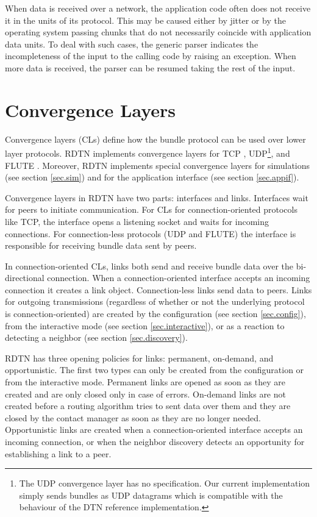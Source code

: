\documentclass[a4paper]{article}
\begin{document}
When data is received over a network, the application code often does not
receive it in the units of its protocol. This may be caused either by jitter or
by the operating system passing chunks that do not necessarily coincide with
application data units. To deal with such cases, the generic parser indicates
the incompleteness of the input to the calling code by raising an exception.
When more data is received, the parser can be resumed taking the rest of the
input.

\section{Convergence Layers}\label{sec.cl}

Convergence layers (CLs) define how the bundle protocol can be used over lower
layer protocols. RDTN implements convergence layers for TCP \cite{dtn-tcp-cl},
UDP\footnote{The UDP convergence layer has no specification. Our current
implementation simply sends bundles as UDP datagrams which is compatible with
the behaviour of the DTN reference implementation.}, and FLUTE \cite{uni-dtn}.
Moreover, RDTN implements special convergence layers for simulations (see
section \ref{sec.sim}) and for the application interface (see section
\ref{sec.appif}).

Convergence layers in RDTN have two parts: interfaces and links. Interfaces wait
for peers to initiate communication. For CLs for connection-oriented protocols
like TCP, the interface opens a listening socket and waits for incoming
connections. For connection-less protocols (UDP and FLUTE) the interface is
responsible for receiving bundle data sent by peers.

In connection-oriented CLs, links both send and receive bundle data over the
bi-directional connection. When a connection-oriented interface accepts an
incoming connection it creates a link object. Connection-less links send data to
peers. Links for outgoing transmissions (regardless of whether or not the
underlying protocol is connection-oriented) are created by the configuration
(see section \ref{sec.config}), from the interactive mode (see section
\ref{sec.interactive}), or as a reaction to detecting a neighbor (see section
\ref{sec.discovery}).

RDTN has three opening policies for links: permanent, on-demand, and
opportunistic. The first two types can only be created from the
configuration or from the interactive mode. Permanent links are opened as soon
as they are created and are only closed only in case of errors. On-demand links
are not created before a routing algorithm tries to sent data over them and they
are closed by the contact manager as soon as they are no longer needed.
Opportunistic links are created when a connection-oriented interface accepts an
incoming connection, or when the neighbor discovery detects an opportunity for
establishing a link to a peer.
\end{document}
